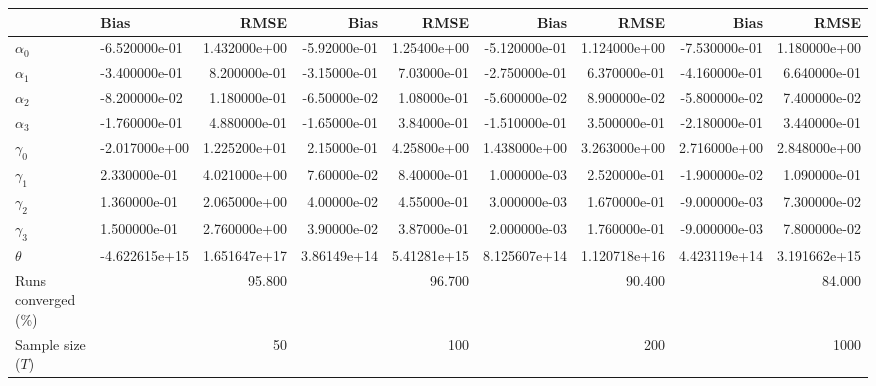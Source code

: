 
\begin{tabular}[t]{llrrrrrrr}
\toprule
  & Bias & RMSE & Bias & RMSE & Bias & RMSE & Bias & RMSE\\
\midrule
$\alpha_{0}$ & -6.520000e-01 & 1.432000e+00 & -5.92000e-01 & 1.25400e+00 & -5.120000e-01 & 1.124000e+00 & -7.530000e-01 & 1.180000e+00\\
$\alpha_{1}$ & -3.400000e-01 & 8.200000e-01 & -3.15000e-01 & 7.03000e-01 & -2.750000e-01 & 6.370000e-01 & -4.160000e-01 & 6.640000e-01\\
$\alpha_{2}$ & -8.200000e-02 & 1.180000e-01 & -6.50000e-02 & 1.08000e-01 & -5.600000e-02 & 8.900000e-02 & -5.800000e-02 & 7.400000e-02\\
$\alpha_{3}$ & -1.760000e-01 & 4.880000e-01 & -1.65000e-01 & 3.84000e-01 & -1.510000e-01 & 3.500000e-01 & -2.180000e-01 & 3.440000e-01\\
$\gamma_{0}$ & -2.017000e+00 & 1.225200e+01 & 2.15000e-01 & 4.25800e+00 & 1.438000e+00 & 3.263000e+00 & 2.716000e+00 & 2.848000e+00\\
$\gamma_{1}$ & 2.330000e-01 & 4.021000e+00 & 7.60000e-02 & 8.40000e-01 & 1.000000e-03 & 2.520000e-01 & -1.900000e-02 & 1.090000e-01\\
$\gamma_{2}$ & 1.360000e-01 & 2.065000e+00 & 4.00000e-02 & 4.55000e-01 & 3.000000e-03 & 1.670000e-01 & -9.000000e-03 & 7.300000e-02\\
$\gamma_{3}$ & 1.500000e-01 & 2.760000e+00 & 3.90000e-02 & 3.87000e-01 & 2.000000e-03 & 1.760000e-01 & -9.000000e-03 & 7.800000e-02\\
$\theta$ & -4.622615e+15 & 1.651647e+17 & 3.86149e+14 & 5.41281e+15 & 8.125607e+14 & 1.120718e+16 & 4.423119e+14 & 3.191662e+15\\
Runs converged (\%) &  & 95.800 &  & 96.700 &  & 90.400 &  & 84.000\\
Sample size ($T$) &  & 50 &  & 100 &  & 200 &  & 1000\\
\bottomrule
\end{tabular}
